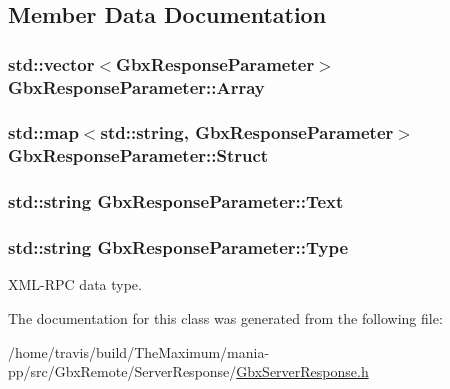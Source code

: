 \subsection{Member Data Documentation}
\hypertarget{classGbxResponseParameter_abd56daae71edf6749b634d0545a85aad}{
\subsubsection[{Array}]{\setlength{\rightskip}{0pt plus 5cm}std\-::vector$<${\bf Gbx\-Response\-Parameter}$>$ Gbx\-Response\-Parameter\-::\-Array}}\label{classGbxResponseParameter_abd56daae71edf6749b634d0545a85aad}
\hypertarget{classGbxResponseParameter_acc26f8d64983f92709d1fa38b8f33e66}{
\subsubsection[{Struct}]{\setlength{\rightskip}{0pt plus 5cm}std\-::map$<$std\-::string, {\bf Gbx\-Response\-Parameter}$>$ Gbx\-Response\-Parameter\-::\-Struct}}\label{classGbxResponseParameter_acc26f8d64983f92709d1fa38b8f33e66}
\hypertarget{classGbxResponseParameter_a2e5cb2904900fc74a47c35c0c2fafc55}{
\subsubsection[{Text}]{\setlength{\rightskip}{0pt plus 5cm}std\-::string Gbx\-Response\-Parameter\-::\-Text}}\label{classGbxResponseParameter_a2e5cb2904900fc74a47c35c0c2fafc55}
\hypertarget{classGbxResponseParameter_aa1700ca65fa2526b112be24b5c0bdbf4}{
\subsubsection[{Type}]{\setlength{\rightskip}{0pt plus 5cm}std\-::string Gbx\-Response\-Parameter\-::\-Type}}\label{classGbxResponseParameter_aa1700ca65fa2526b112be24b5c0bdbf4}


X\-M\-L-\/\-R\-P\-C data type. 



The documentation for this class was generated from the following file\-:\begin{DoxyCompactItemize}
\item 
/home/travis/build/\-The\-Maximum/mania-\/pp/src/\-Gbx\-Remote/\-Server\-Response/\hyperlink{GbxServerResponse_8h}{Gbx\-Server\-Response.\-h}\end{DoxyCompactItemize}
